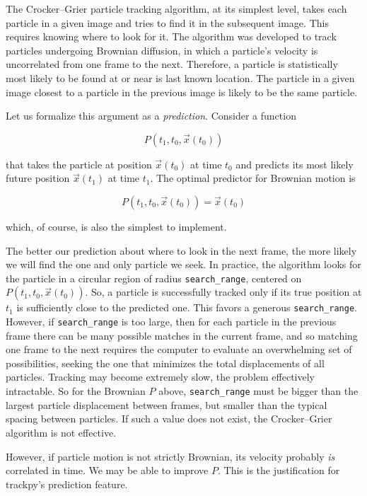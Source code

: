 The Crocker--Grier particle tracking algorithm, at its simplest level, takes each particle in
a given image and tries to find it in the subsequent image. This
requires knowing where to look for it. The algorithm was developed to track particles undergoing Brownian diffusion,
in which a particle's velocity is uncorrelated from one
frame to the next. Therefore, a particle is statistically most likely to be found at or near is last known location. The particle in a given image closest to a particle in the previous image is likely to be the same particle.

Let us formalize this argument as a \emph{prediction}. Consider a function

\begin{equation}
P(t_1, t_0, \vec x(t_0))
\end{equation}

\noindent that takes the particle at position $\vec x(t_0)$ at time $t_0$ and predicts its most likely 
future position $\vec x(t_1)$ at time $t_1$. The optimal predictor for Brownian motion
is

\begin{equation}
P(t_1, t_0, \vec x(t_0)) = \vec x(t_0)
\end{equation}

\noindent which, of course, is also the simplest to implement.

The better our prediction about where to look in the next frame, the
more likely we will find the one and only particle we seek.
In practice, the algorithm looks for the particle in a circular region of radius
\texttt{search\_range}, centered on $P(t_1, t_0, \vec x(t_0))$. So, a particle is successfully tracked only if its true position at $t_1$ is sufficiently close to the predicted one. This favors a generous \texttt{search\_range}. However, if
\texttt{search\_range} is too large, then for each particle in the
previous frame there can be many possible matches in the current frame,
and so matching one frame to the next requires the computer to evaluate
an overwhelming set of possibilities, seeking the one that minimizes the total displacements of all particles. Tracking may become extremely
slow, the problem effectively intractable.
So for the Brownian $P$ above, \texttt{search\_range} must be bigger
than the largest particle displacement between frames, but smaller than
the typical spacing between particles\cite{Crocker1996}. If such a value does not exist, the Crocker--Grier algorithm is not effective.

However, if particle motion is not strictly Brownian, its velocity
probably \emph{is} correlated in time. We may be able to improve $P$. This 
is the justification for trackpy's prediction feature.

